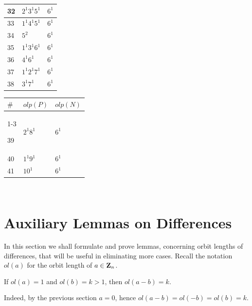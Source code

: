 {\begin{center}
\begin{tabular}{||l|l|l||}
     32  & $2^{1}3^{1}5^{1}$     & $6^{1}$         \\ \hline 
     33  & $1^{1}4^{1}5^{1}$     & $6^{1}$         \\ \hline 
     34  & $5^{2}$               & $6^{1}$         \\ \hline 
     35  & $1^{1}3^{1}6^{1}$     & $6^{1}$         \\ \hline   
     36  & $4^{1}6^{1}$          & $6^{1}$         \\ \hline
     37  & $1^{1}2^{1}7^{1}$     & $6^{1}$         \\ \hline
     38  & $3^{1}7^{1}$          & $6^{1}$         \\ \hline
     
     
\end{tabular}

\end{center}
     
\begin{center}

\begin{tabular}{||l|l|l||}      \hline
  $ \# $ & $olp(P)$              & $olp(N)$           \\ \cline{1-3}


     39  & $2^{1}8^{1}$          & $6^{1}$         \\ \hline
     40  & $1^{1}9^{1}$          & $6^{1}$         \\ \hline            
     41  & $10^{1}$              & $6^{1}$         \\ \hline

\end{tabular}

\end{center}
{ \ }\\




\section{ Auxiliary Lemmas on Differences }\label{sec4} 



In this section we shall formulate and prove lemmas, concerning orbit lengths of differences, 
that will be useful in eliminating more cases. 
Recall the notation $ol(a)$ for the orbit length of $a \in {\bf Z}_{n}$. 
\begin{obs}\label{cl0} 
	If $ol(a)=1$ and $ol(b)=k>1$, then $ol(a-b)=k$.
\end{obs}
	Indeed, by the previous section $a=0$, hence 
	   $ol(a-b)=ol(-b)=ol(b)=k.$
%

}
